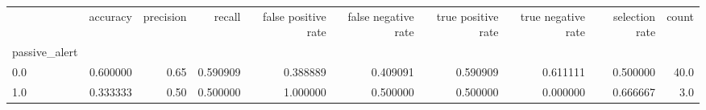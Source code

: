 \begin{tabular}{lrrrrrrrrr}
\toprule
{} &  accuracy &  precision &    recall &  false positive rate &  false negative rate &  true positive rate &  true negative rate &  selection rate &  count \\
passive\_alert &           &            &           &                      &                      &                     &                     &                 &        \\
\midrule
0.0           &  0.600000 &       0.65 &  0.590909 &             0.388889 &             0.409091 &            0.590909 &            0.611111 &        0.500000 &   40.0 \\
1.0           &  0.333333 &       0.50 &  0.500000 &             1.000000 &             0.500000 &            0.500000 &            0.000000 &        0.666667 &    3.0 \\
\bottomrule
\end{tabular}
